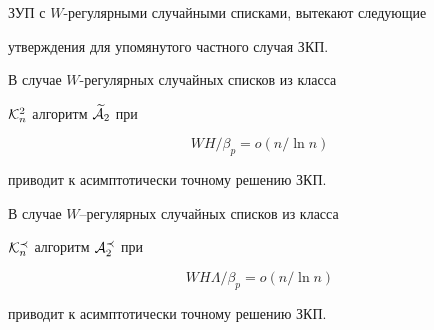 ЗУП с $W$-регулярными случайными списками, вытекают следующие


утверждения для упомянутого частного случая ЗКП.





\begin{thm}


\label{th5}


В случае $W$-регулярных случайных списков из класса


${\cal K}_{n}^{2}$ алгоритм $ \widetilde {\cal A}_{2}$ при 


$$


WH/ \beta_{p} = o(n/ \ln n)


$$


приводит к асимптотически точному решению ЗКП.


\end{thm}





\begin{thm}


\label{th6}


В случае $W$--регулярных случайных списков из класса


${\cal K}_{n}^{\prec}$ алгоритм $ {\cal A}_{2}^{\prec}$ при 


$$


WH\Lambda / \beta_{p} = o(n/ \ln n)


$$


приводит к асимптотически точному решению ЗКП.


\end{thm}





